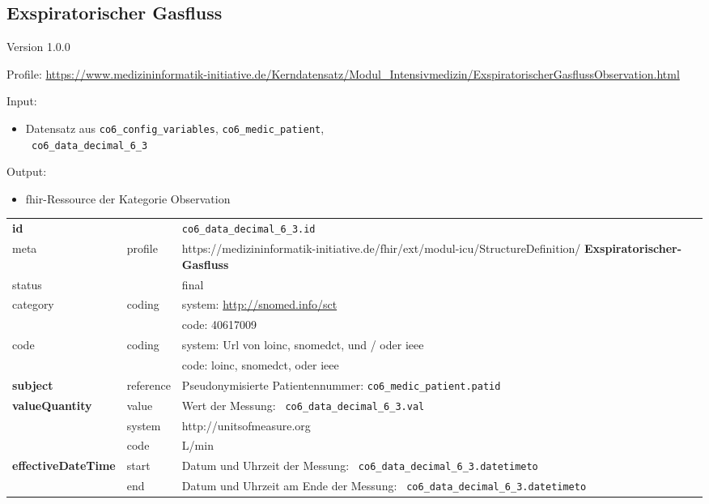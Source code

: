 \subsection{
Exspiratorischer Gasfluss} 
\noindent Version 1.0.0

\noindent Profile: \url{https://www.medizininformatik-initiative.de/Kerndatensatz/Modul_Intensivmedizin/ExspiratorischerGasflussObservation.html}

\noindent Input:
\begin{itemize}
	\item Datensatz aus \texttt{co6\_config\_variables}, \texttt{co6\_medic\_patient}, \\ \texttt{
co6\_data\_decimal\_6\_3}
\end{itemize}
Output:
\begin{itemize}
        \item \ac{fhir}-Ressource der Kategorie \glqq Observation\grqq{}
\end{itemize}
\begin{longtable}{|l|l|p{7.5cm}|}
        \hline
        \rowcolor{lightgray} \multicolumn{3}{|l|}{Data Mapping (inhaltlich)} \\ \hline
        \textbf{id} &  & \texttt{co6\_data\_decimal\_6\_3.id} \\ \hline
	meta & profile & https://medizininformatik-initiative.de/fhir/ext/modul-icu/StructureDefinition/\textbf{
Exspiratorischer-Gasfluss} \\ \hline 
	status &  & final   \\ \hline 
	category & coding & system: \url{http://snomed.info/sct} \\
\cline{3-3}
	& & code: 40617009 \\ \hline
	code & coding & system: Url von \ac{loinc}, \ac{snomedct}, und / oder \ac{ieee} \\ 
	\cline{3-3} 
	 &  & code: \ac{loinc}, \ac{snomedct}, oder \ac{ieee} \\ \hline
	 \textbf{subject}  & reference & Pseudonymisierte Patientennummer: \texttt{co6\_medic\_patient.patid} \\ \hline
	 \textbf{valueQuantity}  & value & Wert der Messung: \texttt{
co6\_data\_decimal\_6\_3.val} \\
        \cline{2-3}
         & system & http://unitsofmeasure.org \\
         \cline{2-3}
         & code & L/min \\ \hline
     \textbf{effectiveDateTime}  & start & Datum und Uhrzeit der Messung: \texttt{
co6\_data\_decimal\_6\_3.datetimeto} \\
    \cline{2-3}
     & end & Datum und Uhrzeit am Ende der Messung: \texttt{
co6\_data\_decimal\_6\_3.datetimeto} \\ \hline
\end{longtable}



